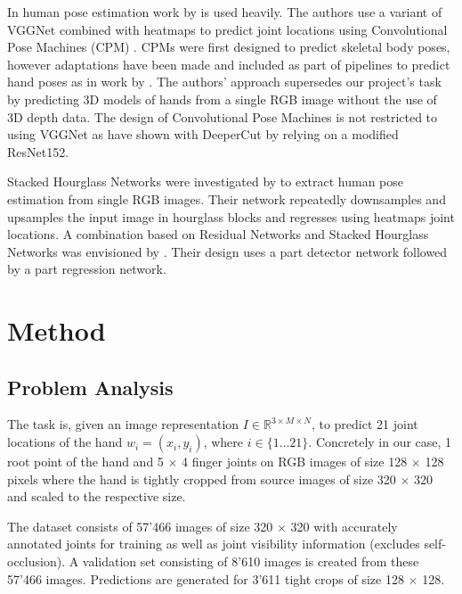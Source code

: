 In human pose estimation work by \citeauthor{DBLP:journals/corr/WeiRKS16} is used heavily. The authors use a variant of VGGNet \cite{Simonyan14c} combined with heatmaps to predict joint locations using Convolutional Pose Machines (CPM) \cite{DBLP:journals/corr/WeiRKS16}. CPMs were first designed to predict skeletal body poses, however adaptations have been made and included as part of pipelines to predict hand poses as in work by \citeauthor{DBLP:journals/corr/ZimmermannB17}. The authors' approach supersedes our project's task by predicting 3D models of hands from a single RGB image \cite{DBLP:journals/corr/ZimmermannB17} without the use of 3D depth data. The design of Convolutional Pose Machines is not restricted to using VGGNet as \citeauthor{DBLP:journals/corr/InsafutdinovPAA16} have shown with DeeperCut \cite{DBLP:journals/corr/InsafutdinovPAA16} by relying on a modified ResNet152.

Stacked Hourglass Networks \cite{DBLP:journals/corr/NewellYD16} were investigated by \citeauthor{DBLP:journals/corr/NewellYD16} to extract human pose estimation from single RGB images. Their network repeatedly downsamples and upsamples the input image in hourglass blocks and regresses using heatmaps joint locations. A combination based on Residual Networks and Stacked Hourglass Networks was envisioned by \citeauthor{DBLP:journals/corr/BulatT16}. Their design uses a part detector network followed by a part regression network.

\section{Method}
\subsection{Problem Analysis}
The task is, given an image representation $I \in \mathbb{R}^{3 \times M \times N}$, to predict 21 joint locations of the hand $w_i = (x_i, y_i)$, where $i \in \{1 \dots 21\}$. Concretely in our case, 1 root point of the hand and 5 $\times$ 4 finger joints on RGB images of size 128 $\times$ 128 pixels where the hand is tightly cropped from source images of size 320 $\times$ 320 and scaled to the respective size.

The dataset \cite{zb2017hand} consists of 57'466 images of size 320 $\times$ 320 with accurately annotated joints for training as well as joint visibility information (excludes self-occlusion). A validation set consisting of 8'610 images is created from these 57'466 images. Predictions are generated for 3'611 tight crops of size 128 $\times$ 128.

